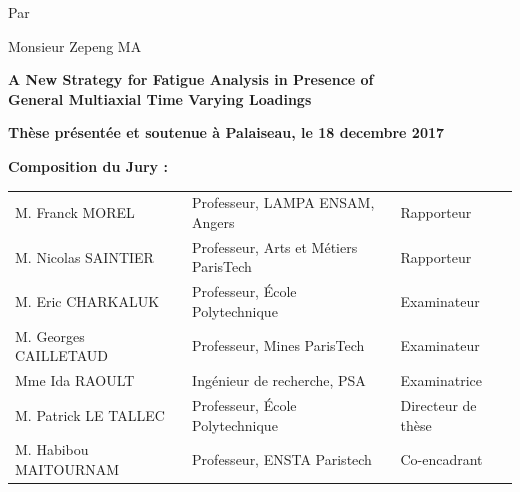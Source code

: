 \begin{titlepage}
\begin{mdframed}
\begin{minipage}[t][22cm][t]{\textwidth}
\begin{center}
{\large Par}
\vspace{12pt}

{\LARGE Monsieur Zepeng MA}
\vspace{36pt}

{\LARGE\bfseries
A New Strategy for Fatigue Analysis in Presence of 
 \\ \vspace{0.4cm}
General Multiaxial Time Varying Loadings}
\end{center}

\vfill
\begin{flushleft}
\large
\textbf{Thèse présentée et soutenue à Palaiseau, le 18 decembre 2017}
\vspace{15pt}

\textbf{Composition du Jury :}

\vspace{15pt}
\begin{tabular}{@{}lll}
M. Franck MOREL & Professeur, LAMPA ENSAM, Angers & Rapporteur \\
M. Nicolas SAINTIER & Professeur, Arts et Métiers ParisTech & Rapporteur \\
M. Eric CHARKALUK & Professeur, École Polytechnique & Examinateur \\
M. Georges CAILLETAUD & Professeur, Mines ParisTech & Examinateur \\
Mme Ida RAOULT & Ingénieur de recherche, PSA & Examinatrice \\
M. Patrick LE TALLEC & Professeur, École Polytechnique & Directeur de thèse \\
M. Habibou MAITOURNAM & Professeur, ENSTA Paristech & Co-encadrant 
\end{tabular}
\end{flushleft}
\end{minipage}
\end{mdframed}
\end{titlepage}

\setcounter{page}{2}
\restoregeometry
